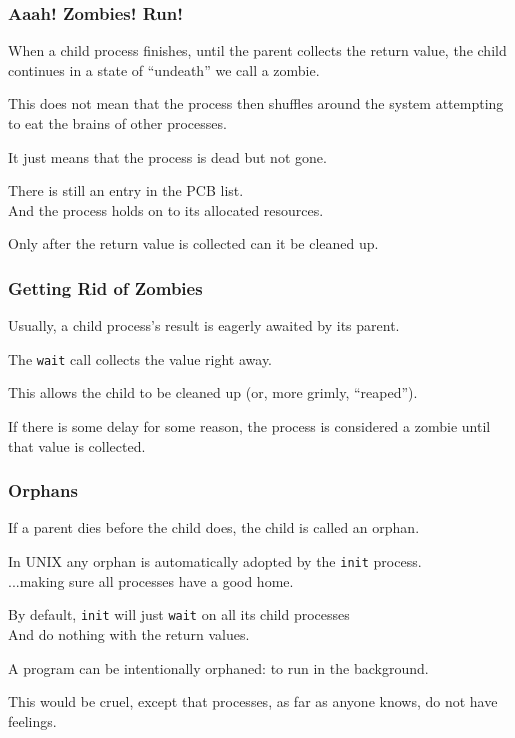 \begin{frame}
	\frametitle{Aaah! Zombies! Run!}

	When a child process finishes, until the parent collects the return value, the child continues in a state of ``undeath'' we call a \alert{zombie}.

	This does not mean that the process then shuffles around the system attempting to eat the brains of other processes.

	It just means that the process is dead but not gone.

	There is still an entry in the PCB list.\\
	\quad And the process holds on to its allocated resources.

	Only after the return value is collected can it be cleaned up.

\end{frame}

\begin{frame}
	\frametitle{Getting Rid of Zombies}

	Usually, a child process's result is eagerly awaited by its parent.

	The \texttt{wait} call collects the value right away.

	This allows the child to be cleaned up (or, more grimly, ``reaped'').

	If there is some delay for some reason, the process is considered a zombie until that value is collected.

\end{frame}


\begin{frame}
	\frametitle{Orphans}

	If a parent dies before the child does, the child is called an \alert{orphan}.

	In UNIX any orphan is automatically adopted by the \texttt{init} process.\\
	\quad ...making sure all processes have a good home.

	By default, \texttt{init} will just \texttt{wait} on all its child processes\\
	\quad And do nothing with the return values.

	A program can be intentionally orphaned: to run in the background.


	This would be cruel, except that processes, as far as anyone knows, do not have feelings.


\end{frame}


